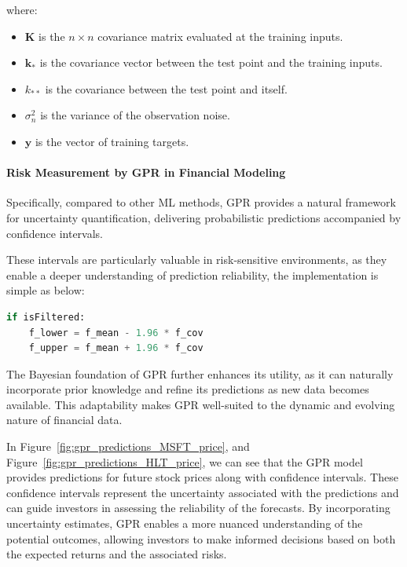 where:

\begin{itemize}
    \item $\mathbf{K}$ is the $n \times n$ covariance matrix evaluated at the training inputs.
    \item $\mathbf{k}_*$ is the covariance vector between the test point and the training inputs.
    \item $k_{**}$ is the covariance between the test point and itself.
    \item $\sigma_n^2$ is the variance of the observation noise.
    \item $\mathbf{y}$ is the vector of training targets.
\end{itemize}

\paragraph{Risk Measurement by GPR in Financial Modeling}

Specifically, compared to other \ac{ML} methods, \ac{GPR} provides a natural framework for uncertainty quantification, delivering probabilistic predictions accompanied by confidence intervals. 

These intervals are particularly valuable in risk-sensitive environments, as they enable a deeper understanding of prediction reliability, the implementation is simple as below: 

\begin{lstlisting}[language=Python]
if isFiltered:
    f_lower = f_mean - 1.96 * f_cov
    f_upper = f_mean + 1.96 * f_cov
\end{lstlisting}

The Bayesian foundation of GPR further enhances its utility, as it can naturally incorporate prior knowledge and refine its predictions as new data becomes available. This adaptability makes GPR well-suited to the dynamic and evolving nature of financial data.

In Figure~\ref{fig:gpr_predictions_MSFT_price}, and Figure~\ref{fig:gpr_predictions_HLT_price}, we can see that the GPR model provides predictions for future stock prices along with confidence intervals. 
These confidence intervals represent the uncertainty associated with the predictions and can guide investors in assessing the reliability of the forecasts. By incorporating uncertainty estimates, GPR enables a more nuanced understanding of the potential outcomes, allowing investors to make informed decisions based on both the expected returns and the associated risks.

